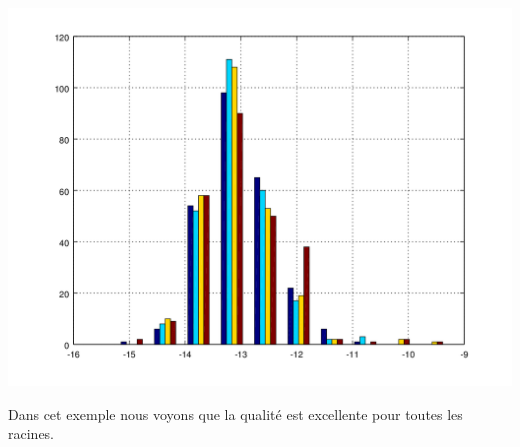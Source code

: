 \documentclass{standalone}
\begin{document}
   \begin{center}
  \includegraphics[height=10cm, width=18cm]{../png/f_rac_hist.png}
  \end{center}

  Dans cet exemple nous voyons que la qualité est excellente pour toutes les racines.
\end{document}
